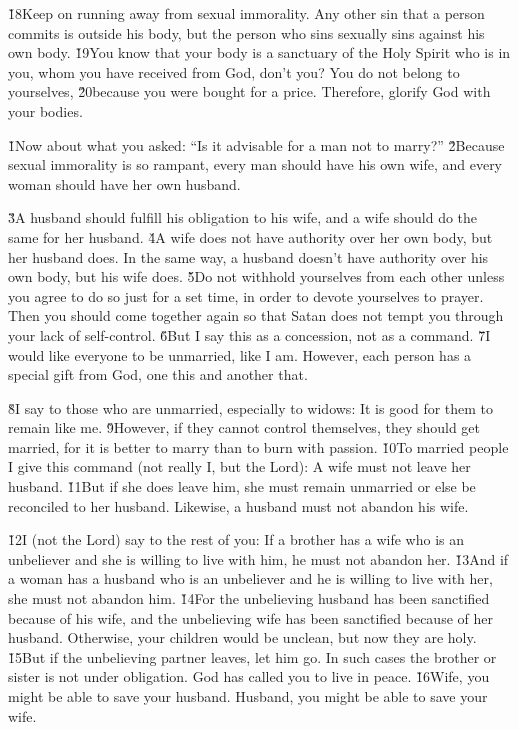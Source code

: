 \v{18}Keep on running away from sexual immorality. Any other sin that a person commits is outside his body, but the person who sins sexually sins against his own body. \v{19}You know that your body is a sanctuary of the Holy Spirit who is in you, whom you have received from God, don't you? You do not belong to yourselves, \v{20}because you were bought for a price. Therefore, glorify God with your bodies.

\v{1}Now about what you asked: ``Is it advisable for a man not to marry?'' \v{2}Because sexual immorality is so rampant, every man should have his own wife, and every woman should have her own husband.

\v{3}A husband should fulfill his obligation to his wife, and a wife should do the same for her husband. \v{4}A wife does not have authority over her own body, but her husband does. In the same way, a husband doesn't have authority over his own body, but his wife does. \v{5}Do not withhold yourselves from each other unless you agree to do so just for a set time, in order to devote yourselves to prayer. Then you should come together again so that Satan does not tempt you through your lack of self-control. \v{6}But I say this as a concession, not as a command. \v{7}I would like everyone to be unmarried, like I am. However, each person has a special gift from God, one this and another that.

\v{8}I say to those who are unmarried, especially to widows: It is good for them to remain like me. \v{9}However, if they cannot control themselves, they should get married, for it is better to marry than to burn with passion. \v{10}To married people I give this command (not really I, but the Lord): A wife must not leave her husband. \v{11}But if she does leave him, she must remain unmarried or else be reconciled to her husband. Likewise, a husband must not abandon his wife.

\v{12}I (not the Lord) say to the rest of you: If a brother has a wife who is an unbeliever and she is willing to live with him, he must not abandon her. \v{13}And if a woman has a husband who is an unbeliever and he is willing to live with her, she must not abandon him. \v{14}For the unbelieving husband has been sanctified because of his wife, and the unbelieving wife has been sanctified because of her husband. Otherwise, your children would be unclean, but now they are holy. \v{15}But if the unbelieving partner leaves, let him go. In such cases the brother or sister is not under obligation. God has called you to live in peace. \v{16}Wife, you might be able to save your husband. Husband, you might be able to save your wife.

